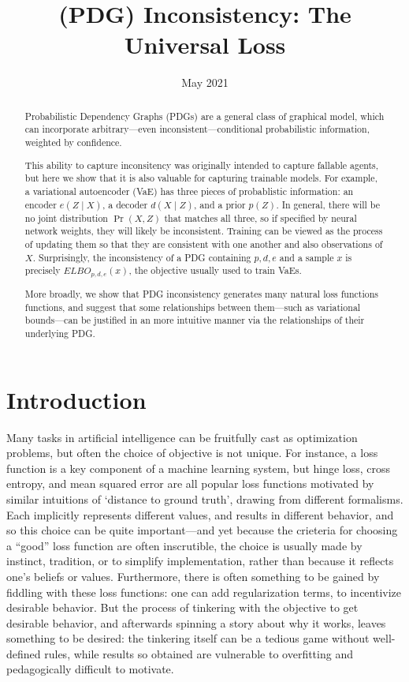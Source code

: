 \documentclass{article}
\title{(PDG) Inconsistency: The Universal Loss}
\author{}
\date{May 2021}
\theoremstyle{plain}
\theoremstyle{definition}
\begin{document}
\maketitle


\begin{abstract}
	Probabilistic Dependency Graphs (PDGs) are a general class of graphical model, which can incorporate arbitrary---even inconsistent---conditional probabilistic information, weighted by confidence.

	This ability to capture inconsitency was originally intended to capture fallable agents,
	but here we show that it is also valuable for capturing trainable models.
	For example, a variational autoencoder (VaE)
	has three pieces of probablistic information: an encoder $e(Z \mid X)$, a decoder $d(X \mid Z)$, and a prior $p(Z)$. In general, there will be no joint distribution $\Pr(X,Z)$ that matches all three, so if specified by neural network weights, they will likely be inconsistent. Training can be viewed as the process of updating them so that they are consistent with one another and also observations of $X$.
	Surprisingly, the inconsistency of a PDG containing $p,d,e$ and a sample $x$ is precisely $\mathit{ELBO}_{p,d,e}(x)$, the objective usually used to train VaEs.

	More broadly, we show that PDG inconsistency generates many natural loss functions functions, and suggest that some relationships between them---such as variational bounds---can be justified in an more intuitive manner via the relationships of their underlying PDG.
\end{abstract}

\section{Introduction}
Many tasks in artificial intelligence can be fruitfully cast as optimization problems, but often the choice of objective is not unique.
For instance, a loss function is a key component of a machine learning system, but hinge loss, cross entropy, and mean squared error are all popular loss functions motivated by similar intuitions of `distance to ground truth', drawing from different formalisms.
Each implicitly represents different values, and results in different behavior, and so this choice can be quite important---and yet because the crieteria for choosing a ``good'' loss function are often inscrutible, the choice is usually made by instinct, tradition, or to simplify implementation, rather than because it reflects one's beliefs or values.
Furthermore, there is often something to be gained by fiddling with these loss functions: one can add regularization terms, to incentivize desirable behavior.
But the process of tinkering with the objective to get desirable behavior, and afterwards spinning a story about why it works, leaves something to be desired:
the tinkering itself can be a tedious game without well-defined rules, while results so obtained are vulnerable to overfitting and pedagogically difficult to motivate.
%
\end{document}
